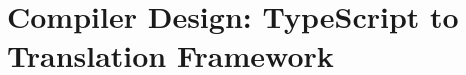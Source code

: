 \chapter{Compiler Design: TypeScript to  Translation Framework}
\label{ch:typescript-gpu-compiler}



%
%
%
%
%
%
%
%
%
%
%
%